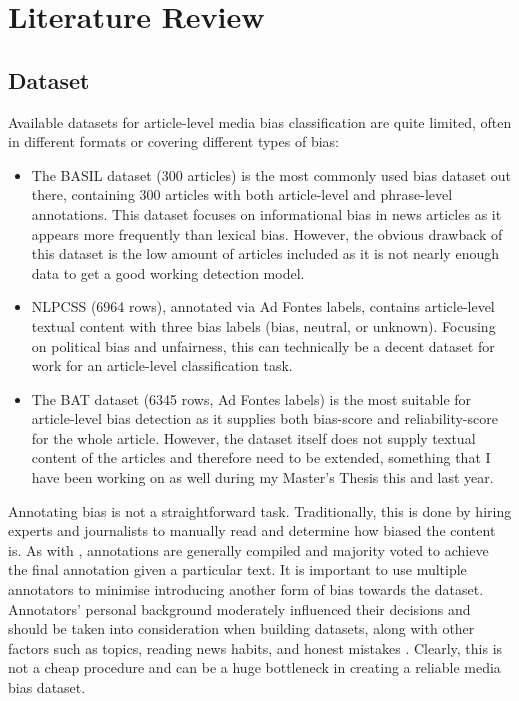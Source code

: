 \chapter{Literature Review}
\label{cha:3}

\section{Dataset}

Available datasets for article-level media bias classification are quite limited, often in different formats or covering different types of bias:
\begin{itemize}
    \item The BASIL dataset \cite{fan-2019-basil} (300 articles) is the most commonly used bias dataset out there, containing 300 articles with both article-level and phrase-level annotations. This dataset focuses on informational bias in news articles as it appears more frequently than lexical bias. However, the obvious drawback of this dataset is the low amount of articles included as it is not nearly enough data to get a good working detection model.
    \item NLPCSS \cite{chen-etal-2020-nlpcss} (6964 rows), annotated via Ad Fontes labels, contains article-level textual content with three bias labels (bias, neutral, or unknown). Focusing on political bias and unfairness, this can technically be a decent dataset for work for an article-level classification task.
    \item The BAT \cite{spinde-2023-bat} dataset (6345 rows, Ad Fontes labels) is the most suitable for article-level bias detection as it supplies both bias-score and reliability-score for the whole article. However, the dataset itself does not supply textual content of the articles and therefore need to be extended, something that I have been working on as well during my Master's Thesis this and last year.
\end{itemize}

Annotating bias is not a straightforward task. Traditionally, this is done by hiring experts and journalists to manually read and determine how biased the content is. As with \cite{spinde-2021-babe}, annotations are generally compiled and majority voted to achieve the final annotation given a particular text. It is important to use multiple annotators to minimise introducing another form of bias towards the dataset. Annotators' personal background moderately influenced their decisions and should be taken into consideration when building datasets, along with other factors such as topics, reading news habits, and honest mistakes \cite{spinde-2021-bias-words}. Clearly, this is not a cheap procedure and can be a huge bottleneck in creating a reliable media bias dataset.

